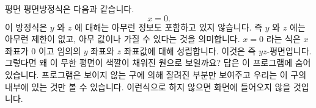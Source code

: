 \begin{surferPage}{평면}
평면방정식은 다음과 같습니다.\[x=0.\] 이 방정식은 $y$ 와 $z$ 에 대해는 아무런 정보도 포함하고 있지 않습니다. 즉 $y$ 와 $z$ 에는 아무런 제한이 없고, 아무 값이나 가질 수 있다는 것을 의미합니다.
$x=0$ 라는 식은 $x$ 좌표가 $0$ 이고 임의의 $y$ 좌표와 $z$ 좌표값에 대해 성립합니다. 이것은 즉 $yz$-평면입니다.
\newline \newline
그렇다면 왜 이 무한 평면이 색깔이 채워진 원으로 보일까요? 답은 이 프로그램에 숨어있습니다. 프로그램은 보이지 않는 구에 의해 잘려진 부분만 보여주고 우리는 이 구의 내부에 있는 것만 볼 수 있습니다. 
이런식으로 하지 않으면 화면에 들어오지 않을 것입니다.
\end{surferPage}

